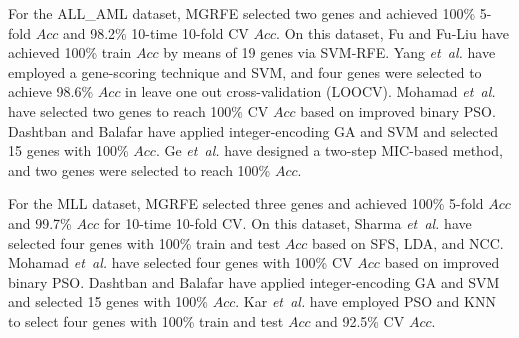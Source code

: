 \documentclass[10pt,journal,compsoc]{IEEEtran}
\begin{document}
	For the ALL\_AML dataset, MGRFE selected two genes and achieved 100\% 5-fold $Acc$ and 98.2\% 10-time 10-fold CV $Acc$. On this dataset, Fu and Fu-Liu \cite{P10} have achieved 100\% train $Acc$ by means of 19 genes via SVM-RFE. Yang \emph{et~al.} \cite{P22} have employed a gene-scoring technique and SVM, and four genes were selected to achieve 98.6\% $Acc$ in leave one out cross-validation (LOOCV). Mohamad \emph{et~al.} \cite{P16} have selected two genes to reach 100\% CV $Acc$ based on improved binary PSO. Dashtban and Balafar \cite{P33} have applied integer-encoding GA and SVM and selected 15 genes with 100\% $Acc$. Ge \emph{et~al.} \cite{W16} have designed a two-step MIC-based method, and two genes were selected to reach 100\% $Acc$.
	
	For the MLL dataset, MGRFE selected three genes and achieved 100\% 5-fold $Acc$ and 99.7\% $Acc$ for 10-time 10-fold CV. On this dataset, Sharma \emph{et~al.} \cite{P18} have selected four genes with 100\% train and test $Acc$ based on SFS, LDA, and NCC. Mohamad \emph{et~al.} \cite{P16} have selected four genes with 100\% CV $Acc$ based on improved binary PSO. Dashtban and Balafar \cite{P33} have applied integer-encoding GA and SVM and selected 15 genes with 100\% $Acc$. Kar \emph{et~al.} \cite{W15} have employed PSO and KNN to select four genes with 100\% train and test $Acc$ and 92.5\% CV $Acc$.
\end{document}
